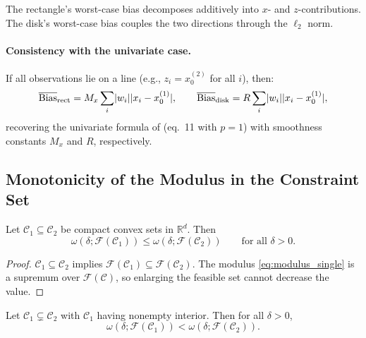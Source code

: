 The rectangle's worst-case bias decomposes additively into $x$- and $z$-contributions.
The disk's worst-case bias couples the two directions through the $\ell_2$ norm.

\paragraph{Consistency with the univariate case.}
If all observations lie on a line (e.g., $z_i = x_0^{(2)}$ for all $i$), then:
\begin{equation*}
	\overline{\mathrm{Bias}}_{\mathrm{rect}} = M_x \sum_i \lvert w_i\rvert \lvert x_i - x_0^{(1)}\rvert, \qquad
	\overline{\mathrm{Bias}}_{\mathrm{disk}} = R \sum_i \lvert w_i\rvert \lvert x_i - x_0^{(1)}\rvert,
\end{equation*}
recovering the univariate formula of \textcite{armstrong_optimal_2018} (eq.~11 with $p = 1$) with smoothness constants $M_x$ and $R$, respectively.


\subsection{Monotonicity of the Modulus in the Constraint Set}\label{sec:tc:monotonicity}

\begin{theorem}[Monotonicity]\label{thm:monotonicity}
	Let $\mathcal{C}_1 \subseteq \mathcal{C}_2$ be compact convex sets in $\mathbb{R}^d$.
	Then
	\begin{equation}\label{eq:monotonicity}
		\omega(\delta; \mathcal{F}(\mathcal{C}_1)) \leq \omega(\delta; \mathcal{F}(\mathcal{C}_2)) \qquad \text{for all } \delta > 0.
	\end{equation}
\end{theorem}

\begin{proof}
	$\mathcal{C}_1 \subseteq \mathcal{C}_2$ implies $\mathcal{F}(\mathcal{C}_1) \subseteq \mathcal{F}(\mathcal{C}_2)$.
	The modulus \eqref{eq:modulus_single} is a supremum over $\mathcal{F}(\mathcal{C})$, so enlarging the feasible set cannot decrease the value.
\end{proof}

\begin{theorem}\label{thm:strict_monotonicity}
	Let $\mathcal{C}_1 \subsetneq \mathcal{C}_2$ with $\mathcal{C}_1$ having nonempty interior.
	Then for all $\delta > 0$,
	\begin{equation}\label{eq:strict_monotonicity}
		\omega(\delta; \mathcal{F}(\mathcal{C}_1)) < \omega(\delta; \mathcal{F}(\mathcal{C}_2)).
	\end{equation}
\end{theorem}

